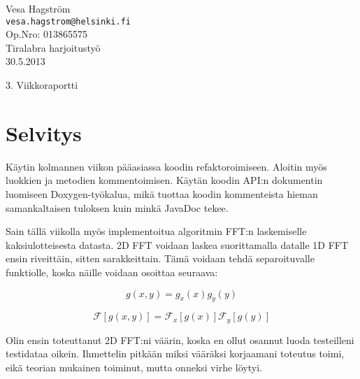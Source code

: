 \documentclass[12pt,a4paper]{report}
\author{Vesa Hagström}
\begin{document}
    \renewcommand{\bibname}{Viitteet}

	\begin{titlepage}
    \label{Title}
	\begin{flushleft}
		\hfill Vesa Hagström 											\\
		\hfill \texttt{vesa.hagstrom@helsinki.fi} 						\\
		\hfill Op.Nro: 013865575											\\
		\hfill Tiralabra harjoitustyö									\\
		\hfill 30.5.2013													\\
	\end{flushleft}

	\vfill

	\begin{center}
		\huge{3. Viikkoraportti}
	\end{center}

	\vfill

	\end{titlepage}

    \section*{Selvitys}
    Käytin kolmannen viikon pääasiassa koodin refaktoroimiseen. Aloitin myös luokkien ja metodien kommentoimisen. Käytän koodin API:n dokumentin luomiseen Doxygen-työkalua, mikä tuottaa koodin kommenteista hieman samankaltaisen tuloksen kuin minkä JavaDoc tekee. 
        
    Sain tällä viikolla myös implementoitua algoritmin FFT:n laskemiselle kaksiulotteisesta datasta. 2D FFT voidaan laskea suorittamalla datalle 1D FFT ensin riveittäin, sitten sarakkeittain. Tämä voidaan tehdä separoituvalle funktiolle, koska näille voidaan osoittaa seuraava:
    
    
    \begin{equation*}
        g(x,y) = g_{x}(x)g_{y}(y)
    \end{equation*}

    \begin{equation*}
        \mathcal{F}[g(x,y)] = \mathcal{F}_{x}[g(x)]\mathcal{F}_{y}[g(y)]
    \end{equation*}
    
    Olin ensin toteuttanut 2D FFT:ni väärin, koska en ollut osannut luoda testeilleni testidataa oikein. Ihmettelin pitkään miksi vääräksi korjaamani toteutus toimi, eikä teorian mukainen toiminut, mutta onneksi virhe löytyi. 
    
\end{document}
